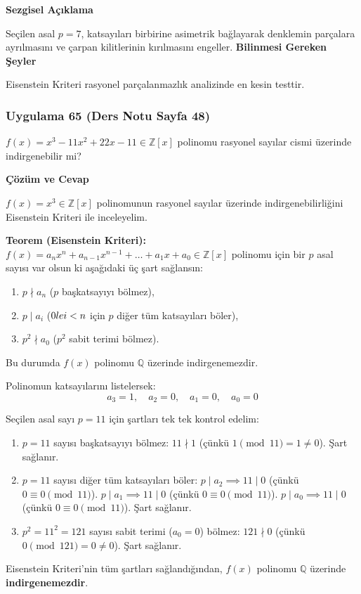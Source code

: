\documentclass[11pt, a4paper]{article}
\newenvironment{cozum}{
    \vspace{0.5cm}
    \noindent\textcolor{green!60!black}{\faCheckCircle\enspace \textbf{\Large Çözüm ve Cevap}}\par\vspace{0.2cm}
}{}
\newenvironment{sezgisel}{
    \vspace{0.5cm}
    \noindent\textcolor{orange!80!black}{\faLightbulb\enspace \textbf{\Large Sezgisel Açıklama}}\par\vspace{0.2cm}
    \itshape
}{}
\newenvironment{bilgi}{
    \vspace{0.5cm}
    \noindent\textcolor{red!70!black}{\faExclamationTriangle\enspace \textbf{\Large Bilinmesi Gereken Şeyler}}\par\vspace{0.2cm}
}{}
\begin{document}
\begin{sezgisel}
Seçilen asal $p=7$, katsayıları birbirine asimetrik bağlayarak denklemin parçalara ayrılmasını ve çarpan kilitlerinin kırılmasını engeller.
\end{sezgisel}
\begin{bilgi}
Eisenstein Kriteri rasyonel parçalanmazlık analizinde en kesin testtir.
\end{bilgi}

\newpage
\subsubsection{Uygulama 65 (Ders Notu Sayfa 48)}
\begin{sorubox}
$f(x) = x^3 - 11x^2 + 22x - 11 \in \mathbb{Z}[x]$ polinomu rasyonel sayılar cismi üzerinde indirgenebilir mi?
\end{sorubox}
\begin{cozum}
$f(x) = x^{3} \in \mathbb{Z}[x]$ polinomunun rasyonel sayılar üzerinde indirgenebilirliğini Eisenstein Kriteri ile inceleyelim.

\textbf{Teorem (Eisenstein Kriteri):} $f(x) = a_n x^n + a_{n-1} x^{n-1} + \dots + a_1 x + a_0 \in \mathbb{Z}[x]$ polinomu için bir $p$ asal sayısı var olsun ki aşağıdaki üç şart sağlansın:
\begin{enumerate}
    \item $p \nmid a_n$ ($p$ başkatsayıyı bölmez),
    \item $p \mid a_i$ ($0 \\le i < n$ için $p$ diğer tüm katsayıları böler),
    \item $p^2 \nmid a_0$ ($p^2$ sabit terimi bölmez).
\end{enumerate}
Bu durumda $f(x)$ polinomu $\mathbb{Q}$ üzerinde indirgenemezdir.

Polinomun katsayılarını listelersek:
\[ a_{3} = 1, \quad a_{2} = 0, \quad a_{1} = 0, \quad a_{0} = 0 \]

Seçilen asal sayı $p = 11$ için şartları tek tek kontrol edelim:
\begin{enumerate}
    \item $p = 11$ sayısı başkatsayıyı bölmez: $11 \nmid 1$ (çünkü $1 \pmod{11} = 1 \neq 0$). Şart sağlanır.
    \item $p = 11$ sayısı diğer tüm katsayıları böler:
    $p \mid a_{2} \implies 11 \mid 0$ (çünkü $0 \equiv 0 \pmod{11}$).
    $p \mid a_{1} \implies 11 \mid 0$ (çünkü $0 \equiv 0 \pmod{11}$).
    $p \mid a_{0} \implies 11 \mid 0$ (çünkü $0 \equiv 0 \pmod{11}$).
    Şart sağlanır.
    \item $p^2 = 11^2 = 121$ sayısı sabit terimi ($a_0 = 0$) bölmez: $121 \nmid 0$ (çünkü $0 \pmod{121} = 0 \neq 0$). Şart sağlanır.
\end{enumerate}

Eisenstein Kriteri'nin tüm şartları sağlandığından, $f(x)$ polinomu $\mathbb{Q}$ üzerinde \textbf{indirgenemezdir}.
\end{cozum}
\end{document}
